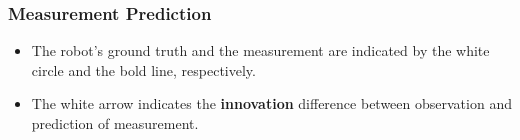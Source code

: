 \begin{frame}
    \frametitle{Measurement Prediction}
    
    \begin{figure}[!h]
    \centering
    \end{figure}
    \footnotesize
    \begin{itemize}
    \item The robot's ground truth and the measurement are indicated by the white circle and the bold line, respectively.
    
    \item The white arrow indicates the \textbf{innovation} difference between observation and prediction of measurement. \end{itemize}
    
    \end{frame}
    
